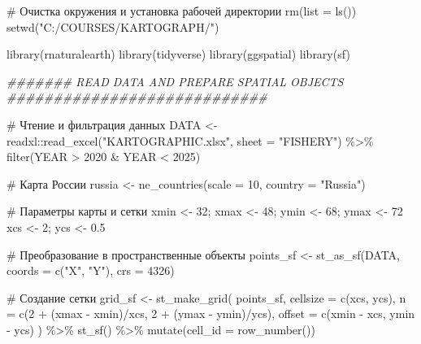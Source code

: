 \documentclass[
  letterpaper,
  DIV=11,
  numbers=noendperiod]{scrreprt}
\newenvironment{Shaded}{\begin{snugshade}}{\end{snugshade}}
\newcommand{\AttributeTok}[1]{\textcolor[rgb]{0.40,0.45,0.13}{#1}}
\newcommand{\CommentTok}[1]{\textcolor[rgb]{0.37,0.37,0.37}{#1}}
\newcommand{\DecValTok}[1]{\textcolor[rgb]{0.68,0.00,0.00}{#1}}
\newcommand{\DocumentationTok}[1]{\textcolor[rgb]{0.37,0.37,0.37}{\textit{#1}}}
\newcommand{\FloatTok}[1]{\textcolor[rgb]{0.68,0.00,0.00}{#1}}
\newcommand{\FunctionTok}[1]{\textcolor[rgb]{0.28,0.35,0.67}{#1}}
\newcommand{\NormalTok}[1]{\textcolor[rgb]{0.00,0.23,0.31}{#1}}
\newcommand{\OtherTok}[1]{\textcolor[rgb]{0.00,0.23,0.31}{#1}}
\newcommand{\SpecialCharTok}[1]{\textcolor[rgb]{0.37,0.37,0.37}{#1}}
\newcommand{\StringTok}[1]{\textcolor[rgb]{0.13,0.47,0.30}{#1}}
\begin{document}
\begin{Shaded}
\begin{Highlighting}[]
\CommentTok{\# Очистка окружения и установка рабочей директории}
\FunctionTok{rm}\NormalTok{(}\AttributeTok{list =} \FunctionTok{ls}\NormalTok{())}
\FunctionTok{setwd}\NormalTok{(}\StringTok{"C:/COURSES/KARTOGRAPH/"}\NormalTok{)}

\FunctionTok{library}\NormalTok{(rnaturalearth)}
\FunctionTok{library}\NormalTok{(tidyverse)}
\FunctionTok{library}\NormalTok{(ggspatial)}
\FunctionTok{library}\NormalTok{(sf)}

\DocumentationTok{\#\#\#\#\#\#\# READ DATA AND PREPARE SPATIAL OBJECTS \#\#\#\#\#\#\#\#\#\#\#\#\#\#\#\#\#\#\#\#\#\#\#\#\#\#\#\#}

\CommentTok{\# Чтение и фильтрация данных}
\NormalTok{DATA }\OtherTok{\textless{}{-}}\NormalTok{ readxl}\SpecialCharTok{::}\FunctionTok{read\_excel}\NormalTok{(}\StringTok{"KARTOGRAPHIC.xlsx"}\NormalTok{, }\AttributeTok{sheet =} \StringTok{"FISHERY"}\NormalTok{) }\SpecialCharTok{\%\textgreater{}\%} 
  \FunctionTok{filter}\NormalTok{(YEAR }\SpecialCharTok{\textgreater{}} \DecValTok{2020} \SpecialCharTok{\&}\NormalTok{ YEAR }\SpecialCharTok{\textless{}} \DecValTok{2025}\NormalTok{)}

\CommentTok{\# Карта России}
\NormalTok{russia }\OtherTok{\textless{}{-}} \FunctionTok{ne\_countries}\NormalTok{(}\AttributeTok{scale =} \DecValTok{10}\NormalTok{, }\AttributeTok{country =} \StringTok{"Russia"}\NormalTok{) }

\CommentTok{\# Параметры карты и сетки}
\NormalTok{xmin }\OtherTok{\textless{}{-}} \DecValTok{32}\NormalTok{; xmax }\OtherTok{\textless{}{-}} \DecValTok{48}\NormalTok{; ymin }\OtherTok{\textless{}{-}} \DecValTok{68}\NormalTok{; ymax }\OtherTok{\textless{}{-}} \DecValTok{72}
\NormalTok{xcs }\OtherTok{\textless{}{-}} \DecValTok{2}\NormalTok{; ycs }\OtherTok{\textless{}{-}} \FloatTok{0.5}

\CommentTok{\# Преобразование в пространственные объекты}
\NormalTok{points\_sf }\OtherTok{\textless{}{-}} \FunctionTok{st\_as\_sf}\NormalTok{(DATA, }\AttributeTok{coords =} \FunctionTok{c}\NormalTok{(}\StringTok{"X"}\NormalTok{, }\StringTok{"Y"}\NormalTok{), }\AttributeTok{crs =} \DecValTok{4326}\NormalTok{)}

\CommentTok{\# Создание сетки}
\NormalTok{grid\_sf }\OtherTok{\textless{}{-}} \FunctionTok{st\_make\_grid}\NormalTok{(}
\NormalTok{  points\_sf,}
  \AttributeTok{cellsize =} \FunctionTok{c}\NormalTok{(xcs, ycs),}
  \AttributeTok{n =} \FunctionTok{c}\NormalTok{(}\DecValTok{2} \SpecialCharTok{+}\NormalTok{ (xmax }\SpecialCharTok{{-}}\NormalTok{ xmin)}\SpecialCharTok{/}\NormalTok{xcs, }\DecValTok{2} \SpecialCharTok{+}\NormalTok{ (ymax }\SpecialCharTok{{-}}\NormalTok{ ymin)}\SpecialCharTok{/}\NormalTok{ycs),}
  \AttributeTok{offset =} \FunctionTok{c}\NormalTok{(xmin }\SpecialCharTok{{-}}\NormalTok{ xcs, ymin }\SpecialCharTok{{-}}\NormalTok{ ycs)}
\NormalTok{) }\SpecialCharTok{\%\textgreater{}\%} 
  \FunctionTok{st\_sf}\NormalTok{() }\SpecialCharTok{\%\textgreater{}\%} 
  \FunctionTok{mutate}\NormalTok{(}\AttributeTok{cell\_id =} \FunctionTok{row\_number}\NormalTok{())}


\end{Highlighting}
\end{Shaded}
\end{document}
